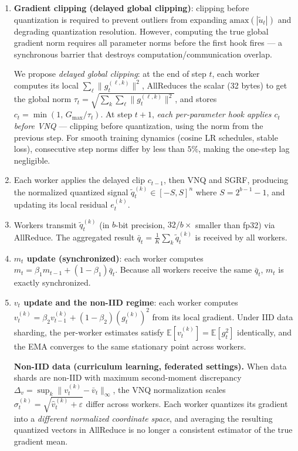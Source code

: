 \documentclass[10pt,twocolumn]{article}
\begin{document}
\begin{enumerate}
  \item \textbf{Gradient clipping (delayed global clipping)}: clipping
    before quantization is required to prevent outliers from expanding
    $\mathrm{amax}(|\tilde{u}_t|)$ and degrading quantization resolution.
    However, computing the true global gradient norm requires all
    parameter norms before the first hook fires — a synchronous barrier
    that destroys computation/communication overlap.

    We propose \emph{delayed global clipping}: at the end of step $t$,
    each worker computes its local $\sum_\ell\|g_t^{(\ell,k)}\|^2$,
    AllReduces the scalar (32 bytes) to get the global norm
    $\tau_t = \sqrt{\sum_k\sum_\ell\|g_t^{(\ell,k)}\|^2}$, and stores
    $c_t = \min(1,\, G_{\max}/\tau_t)$.  At step $t+1$, \emph{each
    per-parameter hook applies $c_t$ before VNQ} — clipping before
    quantization, using the norm from the previous step.  For smooth
    training dynamics (cosine LR schedules, stable loss), consecutive
    step norms differ by less than $5\%$, making the one-step lag negligible.

  \item Each worker applies the delayed clip $c_{t-1}$, then VNQ and
    SGRF, producing the normalized quantized signal
    $\tilde{q}_t^{(k)} \in [-S, S]^n$ where $S = 2^{b-1}-1$, and
    updating its local residual $e_t^{(k)}$.

  \item Workers transmit $\tilde{q}_t^{(k)}$ (in $b$-bit precision,
    $32/b\times$ smaller than fp32) via AllReduce.  The aggregated
    result $\bar{q}_t = \frac{1}{K}\sum_k \tilde{q}_t^{(k)}$ is
    received by all workers.

  \item \textbf{$m_t$ update (synchronized)}: each worker computes
    $m_t = \beta_1 m_{t-1} + (1-\beta_1)\bar{q}_t$.  Because all workers
    receive the same $\bar{q}_t$, $m_t$ is exactly synchronized.

  \item \textbf{$v_t$ update and the non-IID regime}: each worker
    computes $v_t^{(k)} = \beta_2 v_{t-1}^{(k)} + (1-\beta_2)(g_t^{(k)})^2$
    from its local gradient.  Under IID data sharding, the per-worker
    estimates satisfy $\mathbb{E}[v_t^{(k)}] = \mathbb{E}[g_t^2]$
    identically, and the EMA converges to the same stationary point
    across workers.

    \textbf{Non-IID data (curriculum learning, federated settings).}
    When data shards are non-IID with maximum second-moment discrepancy
    $\Delta_v = \sup_k \|v_t^{(k)} - \bar{v}_t\|_\infty$, the VNQ
    normalization scales $\sigma_t^{(k)} = \sqrt{\hat{v}_t^{(k)} + \varepsilon}$
    differ across workers.  Each worker quantizes its gradient into a
    \emph{different normalized coordinate space}, and averaging the
    resulting quantized vectors in AllReduce is no longer a consistent
    estimator of the true gradient mean.


\end{enumerate}
\end{document}
